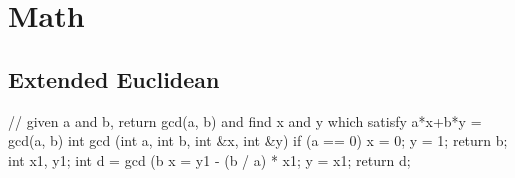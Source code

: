 \section{Math}

\subsection{Extended Euclidean}

\begin{cppcode}
	// given a and b, return gcd(a, b) and find x and y which satisfy a*x+b*y = gcd(a, b)
	int gcd (int a, int b, int &x, int &y) {
		if (a == 0) {
			x = 0;
			y = 1;
			return b;
		}
		int x1, y1;
		int d = gcd (b %
		x = y1 - (b / a) * x1;
		y = x1;
		return d;
	}
\end{cppcode}